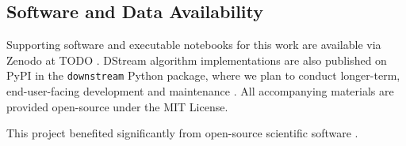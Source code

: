 \subsection{Software and Data Availability} \label{sec:materials}

Supporting software and executable notebooks for this work are available via Zenodo at TODO \citep{moreno2024hsurf}.
DStream algorithm implementations are also published on PyPI in the \texttt{downstream} Python package, where we plan to conduct longer-term, end-user-facing development and maintenance \citep{moreno2024downstream}.
All accompanying materials are provided open-source under the MIT License.

This project benefited significantly from open-source scientific software \citep{2020SciPy-NMeth,harris2020array,reback2020pandas,mckinney-proc-scipy-2010,waskom2021seaborn,hunter2007matplotlib,moreno2023teeplot}.
